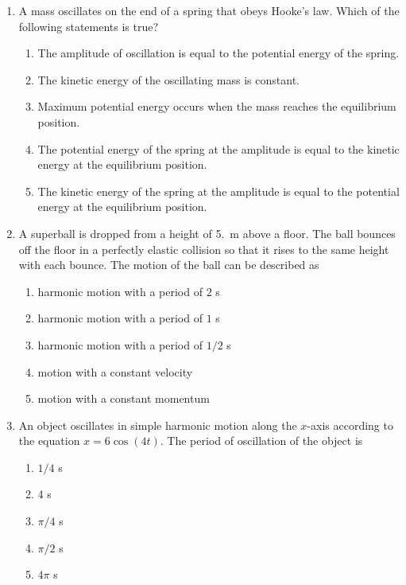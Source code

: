 \documentclass{../../../oss-classkick}
\begin{document}
\genheader


\genmultidirections

\gengravity

\raggedcolumns
\begin{multicols}{2}
  \begin{enumerate}[leftmargin=18pt]
  \item A mass oscillates on the end of a spring that obeys Hooke's law. Which
    of the following statements is true?
    \begin{enumerate}[nosep,leftmargin=18pt,label=(\Alph*)]
    \item The amplitude of oscillation is equal to the potential energy of the
      spring.
    \item The kinetic energy of the oscillating mass is constant.
    \item Maximum potential energy occurs when the mass reaches the
      equilibrium position.
    \item The potential energy of the spring at the amplitude is equal to the
      kinetic energy at the equilibrium position.
    \item The kinetic energy of the spring at the amplitude is equal to the
      potential energy at the equilibrium position.
    \end{enumerate}
    \vspace{.7in}
    
  \item A superball is dropped from a height of \SI{5.}{\metre} above a floor.
    The ball bounces off the floor in a perfectly elastic collision so that it
    rises to the same height with each bounce. The motion of the ball can be
    described as
    \begin{enumerate}[nosep,leftmargin=18pt,label=(\Alph*)]
    \item harmonic motion with a period of $2$ \si{\second}
    \item harmonic motion with a period of $1$ \si{\second}
    \item harmonic motion with a period of $1/2$ \si{\second}
    \item motion with a constant velocity
    \item motion with a constant momentum
    \end{enumerate}
    \vspace{.7in}
    
  \item An object oscillates in simple harmonic motion along the $x$-axis
    according to the equation $x = 6 \cos(4t)$. The period of oscillation of the
    object is
    \begin{enumerate}[nosep,leftmargin=18pt,label=(\Alph*)]
    \item $1/4$ s
    \item 4 s
    \item $\pi/4$ s
    \item $\pi/2$ s
    \item $4\pi$ s
    \end{enumerate}
    

\end{enumerate}
\end{multicols}
\end{document}
